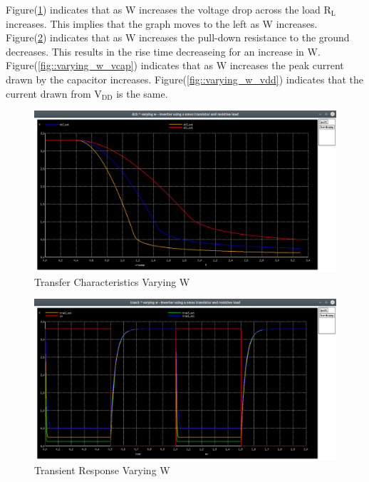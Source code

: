 \documentclass[12pt]{article}
\begin{document}
	Figure(\ref{fig::varying_w_dc}) indicates that as W increases the voltage drop across the load $\text{R}_\text{L}$ increases. This implies that the graph moves to the left as W increases.\\
    Figure(\ref{fig::varying_w_time}) indicates that as W increases the pull-down resistance to the ground decreases. This results in the rise time decreaseing for an increase in W.\\
    Figure(\ref{fig::varying_w_vcap}) indicates that as W increases the peak current drawn by the capacitor increases. Figure(\ref{fig::varying_w_vdd}) indicates that the current drawn from $\text{V}_{\text{DD}}$ is the same.
    \begin{figure}[H]
		\begin{center}
			\includegraphics[scale=0.25]{images/inverter_w_dc.png}
			\caption{Transfer Characteristics Varying W}
			\label{fig::varying_w_dc}
		\end{center}
	\end{figure}
	\begin{figure}[H]
		\begin{center}
			\includegraphics[scale=0.25]{images/inverter_w_tran.png}
			\caption{Transient Response Varying W}
			\label{fig::varying_w_time}
		\end{center}
	\end{figure}
	
\end{document}
